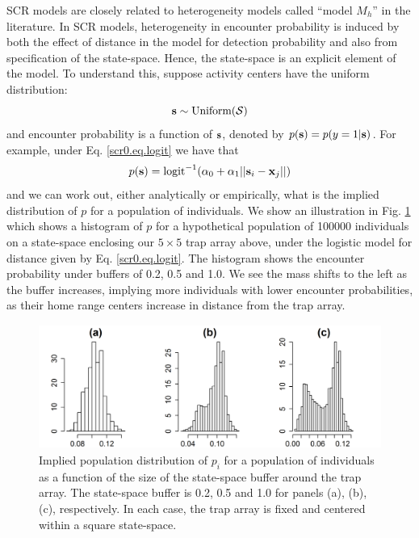 SCR models are closely related to heterogeneity models called ``model
$M_h$'' in the literature. In SCR models,
heterogeneity in encounter probability is induced by both the effect
of distance in the model for detection probability and also from
specification of the state-space. Hence, the state-space  is an
explicit element of the model.
To understand this, suppose activity centers have the uniform distribution:
\[
{\bf s} \sim \mbox{Uniform}({\cal S})
\]
and encounter probability is a function of ${\bf s}$, denoted by
 $p({\bf s}) = p(y=1|{\bf s})$.
For example, under Eq. \ref{scr0.eq.logit}
we have that
\[
p({\bf s}) = \mbox{logit}^{-1} ( \alpha_{0} + \alpha_1 ||{\bf
  s}_{i}-{\bf x}_{j} || )
\]
and we can work out, either analytically or empirically, what is the
implied distribution of $p$ for a population of individuals.  We show
an illustration in Fig. \ref{scr0.fig.buffereffect} which shows a
histogram of $p$ for a hypothetical population of 100000 individuals
on a state-space enclosing our $5 \times 5$ trap array above, under
the logistic model for distance given by Eq. \ref{scr0.eq.logit}.
The
histogram shows the encounter probability under buffers of 0.2, 0.5
and 1.0. We see the mass shifts to the left as the buffer increases,
implying more individuals with lower encounter probabilities, as their
home range centers increase in distance from the trap array.

\begin{figure}[ht]
\begin{center}
\includegraphics[width=4.5in,height=1.6in]{Ch4-SCR0/figs/Mh_buffer}
\end{center}
\caption{Implied population distribution of $p_{i}$ for a population
  of individuals as a function of the size of the state-space buffer
around the trap array. The state-space buffer is 0.2, 0.5 and 1.0 for
panels (a), (b), (c), respectively.
In each case, the trap array is fixed and centered within a
  square state-space.
}
\label{scr0.fig.buffereffect}
\end{figure}

